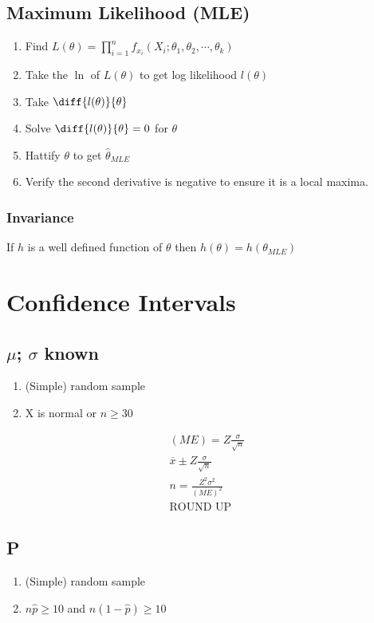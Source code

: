 \subsection{Maximum Likelihood (MLE)}
\begin{enumerate}
\item Find $L(\theta) = \prod_{i=1}^n f_{x_i}(X_i; \theta_1, \theta_2, \cdots, \theta_k)$
\item Take the $\ln$ of $L(\theta)$ to get log likelihood $l(\theta)$
\item Take $\diff{l(\theta)}{\theta}$
\item Solve $\diff{l(\theta)}{\theta} = 0$ for $\theta$
\item Hattify $\theta$ to get $\hat{\theta}_{MLE}$
\item Verify the second derivative is negative to ensure it is a local maxima.
\end{enumerate}

\subsubsection{Invariance}
If $h$ is a well defined function of $\theta$ then $h(\theta) = h(\theta_{MLE})$

\section{Confidence Intervals}
\subsection{$\mu$; $\sigma$ known}
\begin{enumerate}
\item (Simple) random sample
\item X is normal or $n \geq 30$
\end{enumerate}

\begin{align}
  (ME) = Z\frac{\sigma}{\sqrt{n}} \\
  \overbar{x} \pm Z\frac{\sigma}{\sqrt{n}} \\
  n = \frac{Z^2\sigma^2}{(ME)^2} \\
  \text{ROUND UP}
\end{align}

\subsection{P}
\begin{enumerate}
\item (Simple) random sample
\item $n\hat{p} \geq 10$ and $ n(1 - \hat{p}) \geq 10$
\end{enumerate}

